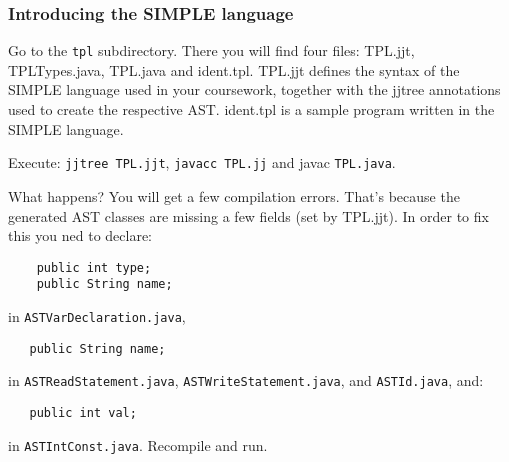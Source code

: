\documentclass{article}
\begin{document}
\subsubsection*{Introducing the SIMPLE language} 

Go to the {\tt tpl} subdirectory. There you will find four files: TPL.jjt, TPLTypes.java, TPL.java and ident.tpl. TPL.jjt defines the syntax of the SIMPLE language used in your coursework, together with the jjtree annotations used to create the respective AST. ident.tpl is a sample program written in the SIMPLE language.

Execute: {\tt jjtree TPL.jjt}, {\tt javacc TPL.jj} and javac {\tt TPL.java}.

What happens? You will get a few compilation errors. That's because the generated AST classes are missing a few fields (set by TPL.jjt). In order to fix this you ned to declare:
\begin{verbatim}
    public int type;
    public String name;
\end{verbatim}
in {\tt ASTVarDeclaration.java},
\begin{verbatim}
   public String name;
\end{verbatim}
in {\tt ASTReadStatement.java}, {\tt ASTWriteStatement.java}, and {\tt ASTId.java}, and:
\begin{verbatim}
   public int val;
\end{verbatim}
in {\tt ASTIntConst.java}. Recompile and run.
\end{document}
